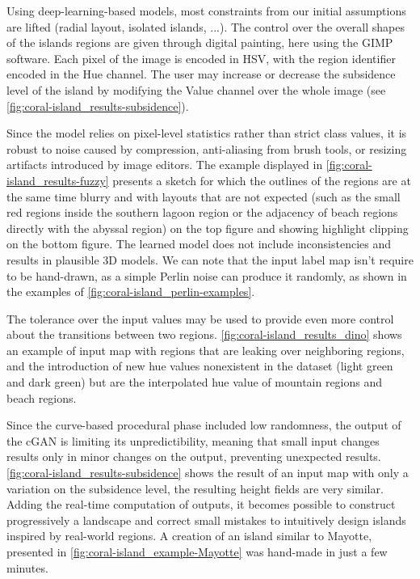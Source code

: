 Using deep-learning-based models, most constraints from our initial assumptions are lifted (radial layout, isolated islands, ...). The control over the overall shapes of the islands regions are given through digital painting, here using the GIMP software. Each pixel of the image is encoded in HSV, with the region identifier encoded in the Hue channel. The user may increase or decrease the subsidence level of the island by modifying the Value channel over the whole image (see \cref{fig:coral-island_results-subsidence}). 

Since the model relies on pixel-level statistics rather than strict class values, it is robust to noise caused by compression, anti-aliasing from brush tools, or resizing artifacts introduced by image editors. The example displayed in \cref{fig:coral-island_results-fuzzy} presents a sketch for which the outlines of the regions are at the same time blurry and with layouts that are not expected (such as the small red regions inside the southern lagoon region or the adjacency of beach regions directly with the abyssal region) on the top figure and showing highlight clipping on the bottom figure. The learned model does not include inconsistencies and results in plausible 3D models. We can note that the input label map isn't require to be hand-drawn, as a simple Perlin noise can produce it randomly, as shown in the examples of \cref{fig:coral-island_perlin-examples}.

The tolerance over the input values may be used to provide even more control about the transitions between two regions. \cref{fig:coral-island_results_dino} shows an example of input map with regions that are leaking over neighboring regions, and the introduction of new hue values nonexistent in the dataset (light green and dark green) but are the interpolated hue value of mountain regions and beach regions.

Since the curve-based procedural phase included low randomness, the output of the cGAN is limiting its unpredictibility, meaning that small input changes results only in minor changes on the output, preventing unexpected results. \cref{fig:coral-island_results-subsidence} shows the result of an input map with only a variation on the subsidence level, the resulting height fields are very similar. Adding the real-time computation of outputs, it becomes possible to construct progressively a landscape and correct small mistakes to intuitively design islands inspired by real-world regions. A creation of an island similar to Mayotte, presented in \cref{fig:coral-island_example-Mayotte} was hand-made in just a few minutes. 

